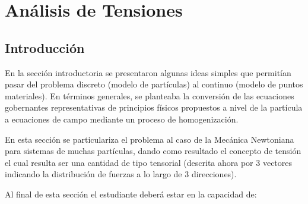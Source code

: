 \documentclass[../notas medios.tex]{subfiles}
\begin{document}
\chapter{Análisis de Tensiones}

\graphicspath{{IMAGES/Cap3/}} 								 %
\section{Introducción}

En la sección introductoria se presentaron algunas ideas simples que permitían
pasar del problema discreto (modelo de partículas) al continuo (modelo de puntos
materiales). En términos generales, se planteaba la conversión de las ecuaciones
gobernantes representativas de principios físicos propuestos a nivel de la
partícula a ecuaciones de campo mediante un proceso de homogenización.

En esta sección se particulariza el problema al caso de la Mecánica Newtoniana
para sistemas de muchas partículas, dando como resultado el concepto de tensión
el cual resulta ser una cantidad de tipo tensorial (descrita ahora por 3
vectores indicando la distribución de fuerzas a lo largo de 3 direcciones). 


Al final de esta sección el estudiante deberá estar en la capacidad de:
\end{document}
